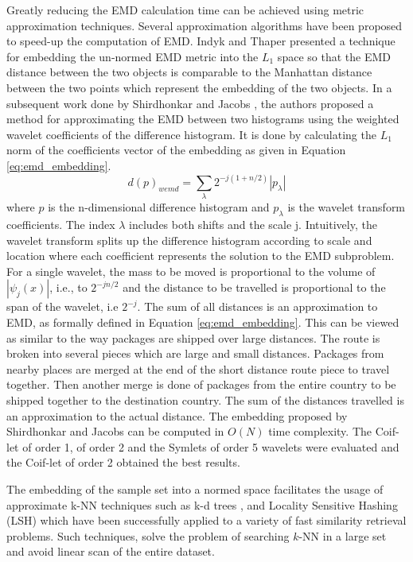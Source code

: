 \documentclass[10pt, conference, compsocconf]{IEEEtran}
\begin{document}
Greatly reducing the EMD calculation time can be achieved using metric approximation techniques.  
Several approximation algorithms have been proposed to speed-up the computation of EMD. 
Indyk and Thaper \cite{indyk2003fast} presented a technique for embedding the un-normed EMD metric into the $L_1$ space so that the EMD distance between the two objects is comparable to the Manhattan distance between the two points which represent the embedding of the two objects.
In a subsequent work done by Shirdhonkar and Jacobs \cite{shirdhonkar2008approximate}, the authors proposed a method for approximating the EMD between two histograms using the weighted wavelet coefficients of the difference histogram. 
It is done by calculating the $L_1$ norm of the coefficients vector of the embedding as given in Equation \ref{eq:emd_embedding}.
\begin{equation}
d(p)_{wemd}= \sum\limits_{\lambda} 2^{-j(1+n/2)}|p_{\lambda}|
\label{eq:emd_embedding}
\end{equation}
where $p$ is the n-dimensional difference histogram and $p_{\lambda}$ is the wavelet transform coefficients. 
The index $\lambda$ includes both shifts and the scale j.
Intuitively, the wavelet transform splits up the difference histogram according to scale and location where each coefficient represents the solution to the EMD subproblem. 
For a single wavelet, the mass to be moved is proportional to the volume of $|\psi_j(x)|$, i.e., to $2^{-jn/2}$ and the distance to be travelled is proportional to the span of the wavelet, i.e $2^{-j}$. The sum of all distances is an approximation to EMD, as formally defined in Equation \ref{eq:emd_embedding}. 
This can be viewed as similar to the way packages are shipped over large distances. 
The route is broken into several pieces which are large and small distances. 
Packages from nearby places are merged at the end of the short distance route piece to travel together. 
Then another merge is done of packages from the entire country to be shipped together to the destination country. 
The sum of the distances travelled is an approximation to the actual distance.
The embedding proposed by Shirdhonkar and Jacobs can be computed in $O\left( N \right)$ time complexity. 
The Coif-let of order 1, of order 2 and the Symlets of order 5 wavelets were evaluated and the Coif-let of order 2 obtained the best results.

The embedding of the sample set into a normed space facilitates the usage of approximate k-NN techniques such as k-d trees \cite{bentley1975multidimensional}, and Locality Sensitive Hashing (LSH) \cite{gionis1999similarity} which have been successfully applied to a variety of fast similarity retrieval problems.
Such techniques, solve the problem of searching $k$-NN in a large set and avoid linear scan of the entire dataset.
\end{document}
